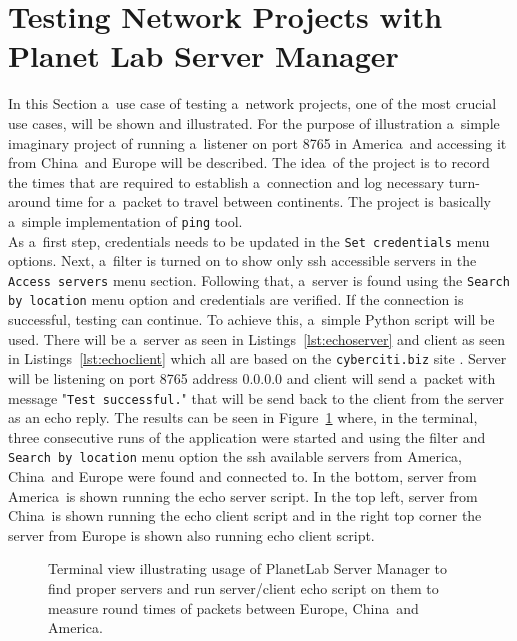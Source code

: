{{{{{{{\section{Testing Network Projects with Planet Lab Server Manager}
\label{section:testing}
In this Section a~use case of testing a~network projects, one of the most crucial use cases, will be shown and illustrated. For the purpose of illustration a~simple imaginary project of running a~listener on port 8765 in America~and accessing it from China~and Europe will be described. The idea~of the project is to record the times that are required to establish a~connection and log necessary turn-around time for a~packet to travel between continents. The project is basically a~simple implementation of \texttt{ping} tool.\\
As a~first step, credentials needs to be updated in the \texttt{Set credentials} menu options. Next, a~filter is turned on to show only ssh accessible servers in the \texttt{Access servers} menu section. Following that, a~server is found using the \texttt{Search by location} menu option and credentials are verified. If the connection is successful, testing can continue. To achieve this, a~simple Python script will be used. There will be a~server as seen in Listings~\ref{lst:echoserver} and client as seen in Listings~\ref{lst:echoclient} which all are based on the \texttt{cyberciti.biz} site \cite{ports}. Server will be listening on port 8765 address 0.0.0.0 and client will send a~packet with message "\texttt{Test successful.}" that will be send back to the client from the server as an echo reply. The results can be seen in Figure~\ref{fig:testingusecase} where, in the terminal, three consecutive runs of the application were started and using the filter and \texttt{Search by location} menu option the ssh available servers from America, China~and Europe were found and connected to. In the bottom, server from America~is shown running the echo server script. In the top left, server from China~is shown running the echo client script and in the right top corner the server from Europe is shown also running echo client script. 

\begin{figure}[H]
	\centering
	\caption{Terminal view illustrating usage of PlanetLab Server Manager to find proper servers and run server/client echo script on them to measure round times of packets between Europe, China~and America.}
	\label{fig:testingusecase}
\end{figure}

}}}}}}}
